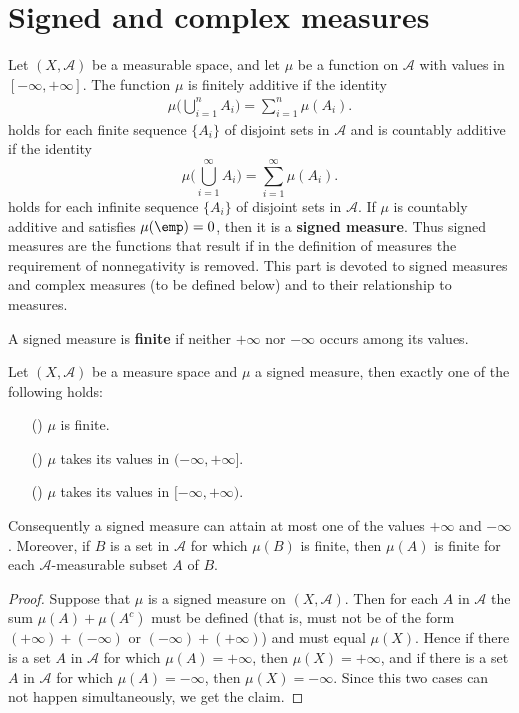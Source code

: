 \section{Signed and complex measures}
Let $(X,\mathcal{A})$ be a measurable space, and let $\mu$ be a function on $\mathcal{A}$ with values in $[-\infty,+\infty]$. The function $\mu$ is finitely additive if the identity
\begin{align*}
\mu\Big(\bigcup_{i=1}^{n}A_i)=\sum_{i=1}^{n}\mu(A_i).
\end{align*}
holds for each finite sequence $\{A_i\}$ of disjoint sets in $\mathcal{A}$ and is countably additive if the identity
\[\mu\Big(\bigcup_{i=1}^{\infty}A_i)=\sum_{i=1}^{\infty}\mu(A_i).\]
holds for each infinite sequence $\{A_i\}$ of disjoint sets in $\mathcal{A}$. If $\mu$ is countably additive and satisfies $\mu(\emp)=0$, then it is a \textbf{signed measure}. Thus signed measures are the functions that result if in the definition of measures the requirement of nonnegativity is removed. This part is devoted to signed measures and complex measures (to be defined below) and to their relationship to measures.
\begin{definition}
A signed measure is \textbf{finite} if neither $+\infty$ nor $-\infty$ occurs among its values.
\end{definition}
\begin{proposition}
Let $(X,\mathcal{A})$ be a measure space and $\mu$ a signed measure, then exactly one of the following holds:
\begin{itemize}
\item[(\rmnum{1})] $\mu$ is finite.
\item[(\rmnum{2})] $\mu$ takes its values in $(-\infty,+\infty]$.
\item[(\rmnum{3})] $\mu$ takes its values in $[-\infty,+\infty)$.
\end{itemize}
Consequently a signed measure can attain at most one of the values $+\infty$ and $-\infty$. Moreover, if $B$ is a set in $\mathcal{A}$ for which $\mu(B)$ is finite, then $\mu(A)$ is finite for each $\mathcal{A}$-measurable subset $A$ of $B$.
\end{proposition}
\begin{proof}
Suppose that $\mu$ is a signed measure on $(X,\mathcal{A})$. Then for each $A$ in $\mathcal{A}$ the sum $\mu(A)+\mu(A^c)$ must be defined (that is, must not be of the form $(+\infty)+(-\infty)$ or $(-\infty)+(+\infty)$) and must equal $\mu(X)$. Hence if there is a set $A$ in $\mathcal{A}$ for which $\mu(A)=+\infty$, then $\mu(X)=+\infty$, and if there is a set $A$ in $\mathcal{A}$ for which $\mu(A)=-\infty$, then $\mu(X)=-\infty$. Since this two cases can not happen simultaneously, we get the claim.
\end{proof}
